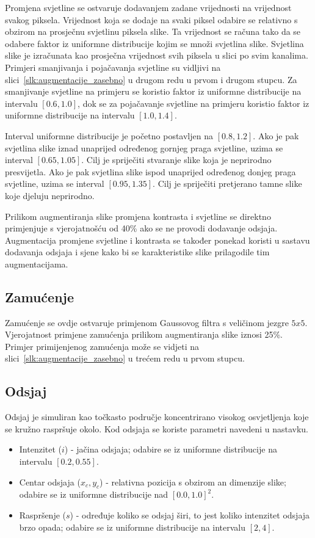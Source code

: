 \documentclass[diplomskirad]{fer}
\begin{document}
			Promjena svjetline se ostvaruje dodavanjem zadane vrijednosti na vrijednost svakog piksela. Vrijednost koja se dodaje na svaki piksel odabire se relativno s obzirom na prosječnu svjetlinu piksela slike. Ta vrijednost se računa tako da se odabere faktor iz uniformne distribucije kojim se množi svjetlina slike. Svjetlina slike je izračunata kao prosječna vrijednost svih piksela u slici po svim kanalima. Primjeri smanjivanja i pojačavanja svjetline su vidljivi na slici~\ref{slk:augmentacije_zasebno} u drugom redu u prvom i drugom stupcu. Za smanjivanje svjetline na primjeru se koristio faktor iz uniformne distribucije na intervalu $[0.6, 1.0]$, dok se za pojačavanje svjetline na primjeru koristio faktor iz uniformne distribucije na intervalu $[1.0, 1.4]$.
			
			Interval uniformne distribucije je početno postavljen na $[0.8, 1.2]$. Ako je pak svjetlina slike iznad unaprijed određenog gornjeg praga svjetline, uzima se interval $[0.65, 1.05]$. Cilj je spriječiti stvaranje slike koja je neprirodno presvijetla. Ako je pak svjetlina slike ispod unaprijed određenog donjeg praga svjetline, uzima se interval $[0.95, 1.35]$. Cilj je spriječiti pretjerano tamne slike koje djeluju neprirodno.
			
			Prilikom augmentiranja slike promjena kontrasta i svjetline se direktno primjenjuje s vjerojatnošću od 40\% ako se ne provodi dodavanje odsjaja. Augmentacija promjene svjetline i kontrasta se također ponekad koristi u sastavu dodavanja odsjaja i sjene kako bi se karakteristike slike prilagodile tim augmentacijama.
		
		\subsection{Zamućenje}
			Zamućenje se ovdje ostvaruje primjenom Gaussovog filtra s veličinom jezgre $5x5$. Vjerojatnost primjene zamućenja prilikom augmentiranja slike iznosi 25\%. Primjer primijenjenog zamućenja može se vidjeti na slici~\ref{slk:augmentacije_zasebno} u trećem redu u prvom stupcu.
		
		\subsection{Odsjaj}
			Odsjaj je simuliran kao točkasto područje koncentrirano visokog osvjetljenja koje se kružno raspršuje okolo. Kod odsjaja se koriste parametri navedeni u nastavku.
			\begin{itemize}
				\item Intenzitet ($i$) - jačina odsjaja; odabire se iz uniformne distribucije na intervalu $[0.2, 0.55]$.
				\item Centar odsjaja ($x_c, y_c$) - relativna pozicija s obzirom an dimenzije slike; odabire se iz uniformne distribucije nad $[0.0, 1.0]^2$.
				\item Raspršenje ($s$) - određuje koliko se odsjaj širi, to jest koliko intenzitet odsjaja brzo opada; odabire se iz uniformne distribucije na intervalu $[2, 4]$.
			\end{itemize}
			
\end{document}
